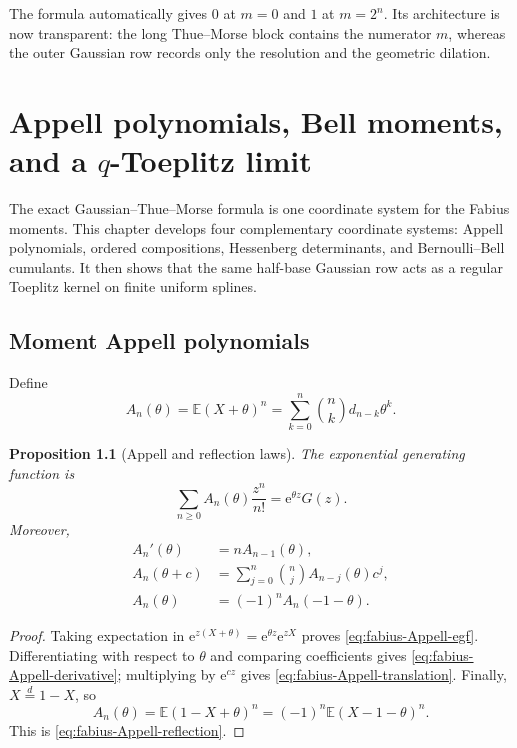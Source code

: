 \documentclass[11pt,oneside,openany]{book}
\newtheorem{proposition}[theorem]{Proposition}
\theoremstyle{definition}
\theoremstyle{remark}
\newcommand{\e}{\mathrm e}
\newcommand{\Expect}{\mathbb E}
\begin{document}
The formula automatically gives $0$ at $m=0$ and $1$ at $m=2^n$.  Its
architecture is now transparent: the long Thue--Morse block contains the
numerator $m$, whereas the outer Gaussian row records only the resolution and
the geometric dilation.

\chapter{Appell polynomials, Bell moments, and a \texorpdfstring{$q$}{q}-Toeplitz limit}\label{chap:fabius-connections}

The exact Gaussian--Thue--Morse formula is one coordinate system for the
Fabius moments.  This chapter develops four complementary coordinate systems:
Appell polynomials, ordered compositions, Hessenberg determinants, and
Bernoulli--Bell cumulants.  It then shows that the same half-base Gaussian row
acts as a regular Toeplitz kernel on finite uniform splines.

\section{Moment Appell polynomials}

Define
\begin{equation}\label{eq:fabius-Appell}
 A_n(\theta)=\Expect(X+\theta)^n
 =\sum_{k=0}^n\binom nkd_{n-k}\theta^k.
\end{equation}

\begin{proposition}[Appell and reflection laws]\label{prop:fabius-Appell-laws}
The exponential generating function is
\begin{equation}\label{eq:fabius-Appell-egf}
 \sum_{n\ge0}A_n(\theta)\frac{z^n}{n!}
 =\e^{\theta z}G(z).
\end{equation}
Moreover,
\begin{align}
 A_n'(\theta)&=nA_{n-1}(\theta),
 \label{eq:fabius-Appell-derivative}\\
 A_n(\theta+c)&=\sum_{j=0}^n\binom njA_{n-j}(\theta)c^j,
 \label{eq:fabius-Appell-translation}\\
 A_n(\theta)&=(-1)^nA_n(-1-\theta).
 \label{eq:fabius-Appell-reflection}
\end{align}
\end{proposition}

\begin{proof}
Taking expectation in
$\e^{z(X+\theta)}=\e^{\theta z}\e^{zX}$ proves
\eqref{eq:fabius-Appell-egf}.  Differentiating with respect to $\theta$ and
comparing coefficients gives \eqref{eq:fabius-Appell-derivative}; multiplying
by $\e^{cz}$ gives \eqref{eq:fabius-Appell-translation}.  Finally,
$X\overset d=1-X$, so
\[
 A_n(\theta)=\Expect(1-X+\theta)^n
 =(-1)^n\Expect(X-1-\theta)^n.
\]
This is \eqref{eq:fabius-Appell-reflection}.
\end{proof}
\end{document}
